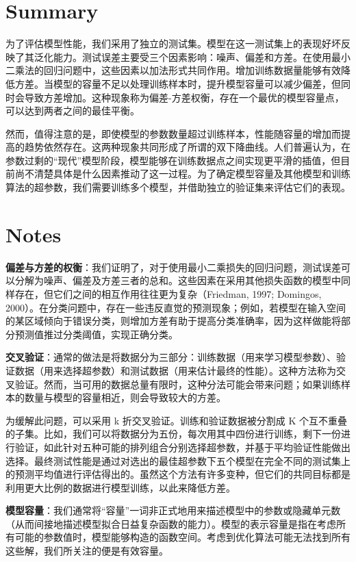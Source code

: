 \section{Summary}

为了评估模型性能，我们采用了独立的测试集。模型在这一测试集上的表现好坏反映了其泛化能力。测试误差主要受三个因素影响：噪声、偏差和方差。在使用最小二乘法的回归问题中，这些因素以加法形式共同作用。增加训练数据量能够有效降低方差。当模型的容量不足以处理训练样本时，提升模型容量可以减少偏差，但同时会导致方差增加。这种现象称为偏差-方差权衡，存在一个最优的模型容量点，可以达到两者之间的最佳平衡。

然而，值得注意的是，即使模型的参数数量超过训练样本，性能随容量的增加而提高的趋势依然存在。这两种现象共同形成了所谓的双下降曲线。人们普遍认为，在参数过剩的“现代”模型阶段，模型能够在训练数据点之间实现更平滑的插值，但目前尚不清楚具体是什么因素推动了这一过程。为了确定模型容量及其他模型和训练算法的超参数，我们需要训练多个模型，并借助独立的验证集来评估它们的表现。
\section{Notes}
\textbf{偏差与方差的权衡}：我们证明了，对于使用最小二乘损失的回归问题，测试误差可以分解为噪声、偏差及方差三者的总和。这些因素在采用其他损失函数的模型中同样存在，但它们之间的相互作用往往更为复杂（Friedman, 1997; Domingos, 2000）。在分类问题中，存在一些违反直觉的预测现象；例如，若模型在输入空间的某区域倾向于错误分类，则增加方差有助于提高分类准确率，因为这样做能将部分预测值推过分类阈值，实现正确分类。

\textbf{交叉验证}：通常的做法是将数据分为三部分：训练数据（用来学习模型参数）、验证数据（用来选择超参数）和测试数据（用来估计最终的性能）。这种方法称为交叉验证。然而，当可用的数据总量有限时，这种分法可能会带来问题；如果训练样本的数量与模型的容量相近，则会导致较大的方差。

为缓解此问题，可以采用 k 折交叉验证。训练和验证数据被分割成 K 个互不重叠的子集。比如，我们可以将数据分为五份，每次用其中四份进行训练，剩下一份进行验证，如此针对五种可能的排列组合分别选择超参数，并基于平均验证性能做出选择。最终测试性能是通过对选出的最佳超参数下五个模型在完全不同的测试集上的预测平均值进行评估得出的。虽然这个方法有许多变种，但它们的共同目标都是利用更大比例的数据进行模型训练，以此来降低方差。

\textbf{模型容量}：我们通常将“容量”一词非正式地用来描述模型中的参数或隐藏单元数（从而间接地描述模型拟合日益复杂函数的能力）。模型的表示容量是指在考虑所有可能的参数值时，模型能够构造的函数空间。考虑到优化算法可能无法找到所有这些解，我们所关注的便是有效容量。

